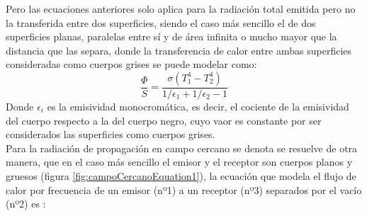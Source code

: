  Pero las ecuaciones anteriores solo aplica para la radiación total emitida pero no la transferida entre dos superficies, siendo el caso más sencillo el de dos superficies planas, paralelas entre sí y de área infinita o mucho mayor que la distancia que las separa, donde la transferencia de calor entre ambas superficies consideradas como cuerpos grises se puede modelar como:
\begin{equation}
\frac{\Phi}{S}=\frac{\sigma \left( T_1^4 -T_2^4 \right)}{1/\epsilon_1 +1/\epsilon_2 -1}
\label{eq:flujoCalorSuperficiesGrises}
\end{equation}
Donde $\epsilon_i$ es la emisividad monocromática, es decir, el cociente de la emisividad del cuerpo respecto a la del cuerpo negro, cuyo vaor es constante por ser considerados las superficies como cuerpos grises.\\

Para la radiación de propagación en campo cercano se denota se resuelve de otra manera, que en el caso más sencillo el emisor y el receptor son cuerpos planos y gruesos (figura \ref{fig:campoCercanoEquation1}), la ecuación que modela el flujo de calor por frecuencia de un emisor (nº1) a un receptor (nº3) separados por el vacío (nº2) es \cite{nfTPV_equations}:

